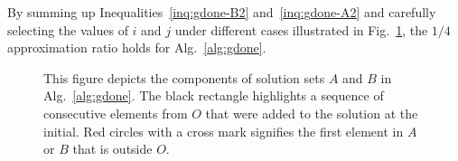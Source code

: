 By summing up Inequalities~\eqref{inq:gdone-B2} and~\eqref{inq:gdone-A2} and carefully
selecting the values of $i$ and $j$ under different cases illustrated in Fig.~\ref{fig:gdone},
the $1/4$ approximation ratio holds for Alg.~\ref{alg:gdone}.
\begin{figure}[ht]
\centering
{}
    \caption{This figure depicts the components of solution sets $A$ and $B$ in Alg.~\ref{alg:gdone}.
    The black rectangle highlights a sequence of consecutive elements from $O$
    that were added to the solution at the initial.
    Red circles with a cross mark signifies the first element in $A$ or $B$ that is outside $O$.
    }
\label{fig:gdone}
\end{figure}






